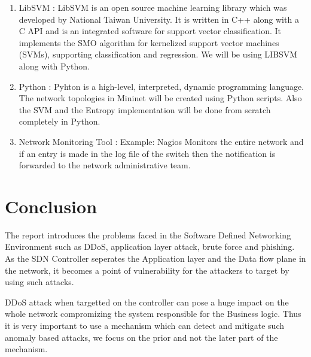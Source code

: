 \documentclass[12pt,a4paper,final]{report}
\begin{document}
\begin{enumerate}
\item
LibSVM :
\newline
LibSVM is an open source machine learning library which was developed by National Taiwan University. It is written in C++ along with a C API and is an integrated software for support vector classification. It implements the SMO algorithm for kernelized support vector machines (SVMs), supporting classification and regression. We will be using LIBSVM along with Python.

\item
Python :
\newline
Pyhton is a high-level, interpreted, dynamic programming language. The network topologies in Mininet will be created using Python scripts. Also the SVM and the Entropy implementation will be done from scratch completely in Python. 

\item
Network Monitoring Tool :
\newline
Example: Nagios
\newline
Monitors the entire network and if an entry is made in the log file of the switch then the notification is forwarded to the network administrative team. 
\end{enumerate}
\newpage

\chapter{Conclusion}
\thispagestyle{empty}
\newpage
The report introduces the problems faced in the Software Defined Networking Environment such as DDoS,
application layer attack, brute force and phishing. As the SDN Controller seperates the Application layer and 
the Data flow plane in the network, it becomes a point of vulnerability for the attackers to target by using 
such attacks.

DDoS attack when targetted on the controller can pose a huge impact on the whole network compromizing the system 
responsible for the Business logic. Thus it is very important to use a mechanism which can detect and mitigate such 
anomaly based attacks, we focus on the prior and not the later part of the mechanism.
\end{document}
